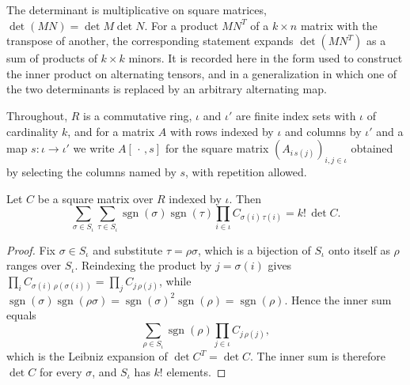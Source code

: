 The determinant is multiplicative on square matrices, $\det(MN) = \det M \det N$. For a product $MN^{T}$ of a $k \times n$ matrix with the transpose of another, the corresponding statement expands $\det(MN^{T})$ as a sum of products of $k \times k$ minors. It is recorded here in the form used to construct the inner product on alternating tensors, and in a generalization in which one of the two determinants is replaced by an arbitrary alternating map.

Throughout, $R$ is a commutative ring, $\iota$ and $\iota'$ are finite index sets with $\iota$ of cardinality $k$, and for a matrix $A$ with rows indexed by $\iota$ and columns by $\iota'$ and a map $s \colon \iota \to \iota'$ we write $A[\,\cdot\,, s]$ for the square matrix $(A_{i\,s(j)})_{i,j \in \iota}$ obtained by selecting the columns named by $s$, with repetition allowed.

\begin{lemma}
\label{lem:sum-sign-prod-det}




Let $C$ be a square matrix over $R$ indexed by $\iota$. Then
\[
\sum_{\sigma \in S_\iota} \sum_{\tau \in S_\iota} \operatorname{sgn}(\sigma)\operatorname{sgn}(\tau) \prod_{i \in \iota} C_{\sigma(i)\,\tau(i)} = k!\,\det C .
\]
\end{lemma}
\begin{proof}

Fix $\sigma \in S_\iota$ and substitute $\tau = \rho\sigma$, which is a bijection of $S_\iota$ onto itself as $\rho$ ranges over $S_\iota$. Reindexing the product by $j = \sigma(i)$ gives $\prod_{i} C_{\sigma(i)\,\rho(\sigma(i))} = \prod_{j} C_{j\,\rho(j)}$, while $\operatorname{sgn}(\sigma)\operatorname{sgn}(\rho\sigma) = \operatorname{sgn}(\sigma)^2\operatorname{sgn}(\rho) = \operatorname{sgn}(\rho)$. Hence the inner sum equals
\[
\sum_{\rho \in S_\iota} \operatorname{sgn}(\rho) \prod_{j \in \iota} C_{j\,\rho(j)},
\]
which is the Leibniz expansion of $\det C^{T} = \det C$. The inner sum is therefore $\det C$ for every $\sigma$, and $S_\iota$ has $k!$ elements.
\end{proof}

